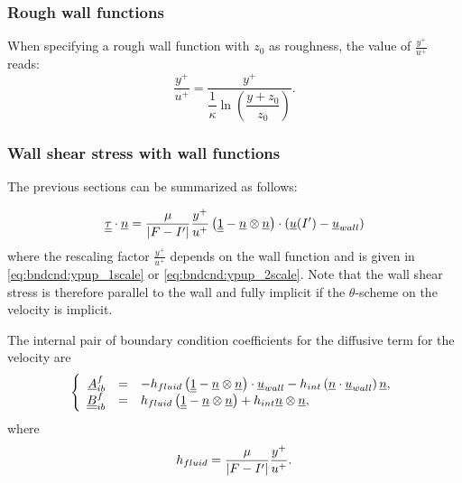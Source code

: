 \subsubsection{Rough wall functions}\label{sec:bndcnd:2velocityscales}
When specifying a rough wall function with $z_0$ as roughness, the value of $\frac{y^+}{u^+}$ reads:
\begin{equation}\label{eq:bndcnd:ypup_rough}
\dfrac{y^+}{u^+} = \dfrac{y^+}{ \dfrac{1}{\kappa} \ln \left( \dfrac{y+z_0}{z_0}\right)}.
\end{equation}



\subsubsection{Wall shear stress with wall functions}
The previous sections can be summarized as follows:

\begin{equation}
  \underline{\underline{\tau}} \cdot \underline{n} = \dfrac{\mu}{\left| F - {I^\prime} \right| } \dfrac{y^+}{u^+} \left(\underline{\underline{1}} - \underline{n} \otimes \underline{n} \right) \cdot \left(\underline{u}({I^\prime}) - \underline{u}_{wall} \right)
\end{equation}
%
where the rescaling factor $\frac{y^+}{u^+}$ depends on the wall function and is given in \eqref{eq:bndcnd:ypup_1scale} or \eqref{eq:bndcnd:ypup_2scale}. Note that the wall shear stress is therefore parallel to the wall and fully implicit if the $\theta$-scheme on the velocity is implicit.

The internal pair of boundary condition coefficients for the diffusive term for the velocity are
\begin{equation}\label{eq:bndcnd:boundary_condition_wall_function}
\left\lbrace
\begin{array}{r c l}
\underline{A}^f_{ib} & = & -h_{fluid}  \left(\underline{\underline{1}} - \underline{n} \otimes \underline{n} \right) \cdot  \underline{u}_{wall}
 - h_{int} \left( \underline{n} \cdot \underline{u}_{wall}  \right) \underline{n}
, \\
\underline{\underline{B}}^f_{ib} & = & h_{fluid}  \left(\underline{\underline{1}} - \underline{n} \otimes \underline{n} \right)
+ h_{int} \underline{n} \otimes \underline{n}
,
\end{array}
\right.
\end{equation}
where
\begin{equation}
h_{fluid} = \dfrac{\mu}{\left| F - {I^\prime} \right| } \dfrac{y^+}{u^+}.
\end{equation}

